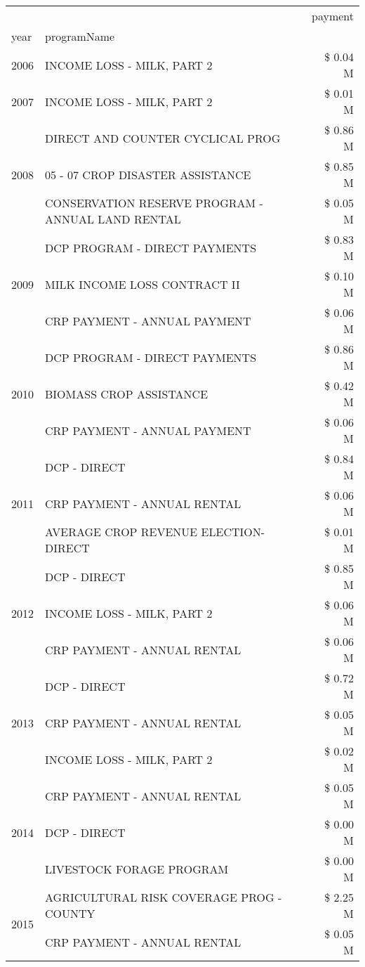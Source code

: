 \begin{tabular}{llr}
\toprule
 &  & payment \\
year & programName &  \\
\midrule
2006 & INCOME LOSS - MILK, PART 2 & \$ 0.04 M \\
\cline{1-3}
2007 & INCOME LOSS - MILK, PART 2 & \$ 0.01 M \\
\cline{1-3}
\multirow[t]{3}{*}{2008} & DIRECT AND COUNTER CYCLICAL PROG & \$ 0.86 M \\
 & 05 - 07 CROP DISASTER ASSISTANCE & \$ 0.85 M \\
 & CONSERVATION RESERVE PROGRAM - ANNUAL LAND RENTAL & \$ 0.05 M \\
\cline{1-3}
\multirow[t]{3}{*}{2009} & DCP PROGRAM - DIRECT PAYMENTS & \$ 0.83 M \\
 & MILK INCOME LOSS CONTRACT II & \$ 0.10 M \\
 & CRP PAYMENT - ANNUAL PAYMENT & \$ 0.06 M \\
\cline{1-3}
\multirow[t]{3}{*}{2010} & DCP PROGRAM - DIRECT PAYMENTS & \$ 0.86 M \\
 & BIOMASS CROP ASSISTANCE & \$ 0.42 M \\
 & CRP PAYMENT - ANNUAL PAYMENT & \$ 0.06 M \\
\cline{1-3}
\multirow[t]{3}{*}{2011} & DCP - DIRECT & \$ 0.84 M \\
 & CRP PAYMENT - ANNUAL RENTAL & \$ 0.06 M \\
 & AVERAGE CROP REVENUE ELECTION-DIRECT & \$ 0.01 M \\
\cline{1-3}
\multirow[t]{3}{*}{2012} & DCP - DIRECT & \$ 0.85 M \\
 & INCOME LOSS - MILK, PART 2 & \$ 0.06 M \\
 & CRP PAYMENT - ANNUAL RENTAL & \$ 0.06 M \\
\cline{1-3}
\multirow[t]{3}{*}{2013} & DCP - DIRECT & \$ 0.72 M \\
 & CRP PAYMENT - ANNUAL RENTAL & \$ 0.05 M \\
 & INCOME LOSS - MILK, PART 2 & \$ 0.02 M \\
\cline{1-3}
\multirow[t]{3}{*}{2014} & CRP PAYMENT - ANNUAL RENTAL & \$ 0.05 M \\
 & DCP - DIRECT & \$ 0.00 M \\
 & LIVESTOCK FORAGE PROGRAM & \$ 0.00 M \\
\cline{1-3}
\multirow[t]{3}{*}{2015} & AGRICULTURAL RISK COVERAGE PROG - COUNTY & \$ 2.25 M \\
 & CRP PAYMENT - ANNUAL RENTAL & \$ 0.05 M \\

\end{tabular}
